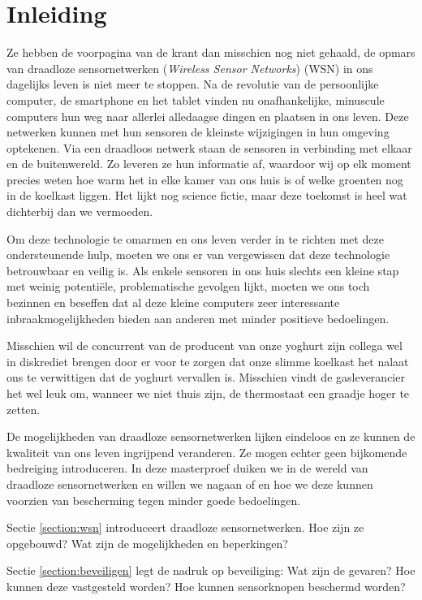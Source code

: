 
\chapter{Inleiding}
\label{inleiding}

Ze hebben de voorpagina van de krant dan misschien nog niet gehaald, de opmars
van draadloze sensornetwerken (\emph{Wireless Sensor Networks}) (WSN) in ons
dagelijks leven is niet meer te stoppen. Na de revolutie van de persoonlijke
computer, de smartphone en het tablet vinden nu onafhankelijke, minuscule
computers hun weg naar allerlei alledaagse dingen en plaatsen in ons leven.
Deze netwerken kunnen met hun sensoren de kleinste wijzigingen in hun omgeving
optekenen. Via een draadloos netwerk staan de sensoren in verbinding met elkaar
en de buitenwereld. Zo leveren ze hun informatie af, waardoor wij op elk moment
precies weten hoe warm het in elke kamer van ons huis is of welke groenten nog
in de koelkast liggen. Het lijkt nog science fictie, maar deze toekomst is heel
wat dichterbij dan we vermoeden.

Om deze technologie te omarmen en ons leven verder in te richten met deze
ondersteunende hulp, moeten we ons er van vergewissen dat deze technologie
betrouwbaar en veilig is. Als enkele sensoren in ons huis slechts een kleine
stap met weinig potenti\"ele, problematische gevolgen lijkt, moeten we ons toch
bezinnen en beseffen dat al deze kleine computers zeer interessante
inbraakmogelijkheden bieden aan anderen met minder positieve bedoelingen.

Misschien wil de concurrent van de producent van onze yoghurt zijn collega wel
in diskrediet brengen door er voor te zorgen dat onze slimme koelkast het
nalaat ons te verwittigen dat de yoghurt vervallen is. Misschien vindt de
gasleverancier het wel leuk om, wanneer we niet thuis zijn, de thermostaat een
graadje hoger te zetten.

De mogelijkheden van draadloze sensornetwerken lijken eindeloos en ze kunnen de
kwaliteit van ons leven ingrijpend veranderen. Ze mogen echter geen bijkomende
bedreiging introduceren. In deze masterproef duiken we in de wereld van
draadloze sensornetwerken en willen we nagaan of en hoe we deze kunnen voorzien
van bescherming tegen minder goede bedoelingen.

Sectie \ref{section:wsn} introduceert draadloze sensornetwerken. Hoe zijn ze
opgebouwd? Wat zijn de mogelijkheden en beperkingen? 

Sectie \ref{section:beveiligen} legt de nadruk op beveiliging: Wat zijn de
gevaren? Hoe kunnen deze vastgesteld worden? Hoe kunnen sensorknopen beschermd
worden?

